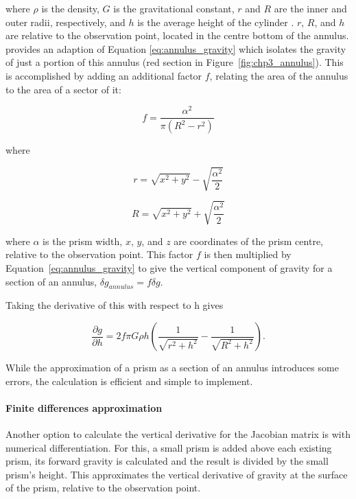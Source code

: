 \noindent
where $\rho$ is the density, $G$ is the gravitational constant, $r$ and $R$ are the inner and outer radii, respectively, and $h$ is the average height of the cylinder \citep{hammerterrain1939}. $r$, $R$, and $h$ are relative to the observation point, located in the centre bottom of the annulus. \citet{mccubbineairborne2016} provides an adaption of Equation \ref{eq:annulus_gravity} which isolates the gravity of just a portion of this annulus (red section in Figure~\ref{fig:chp3_annulus}). This is accomplished by adding an additional factor $f$, relating the area of the annulus to the area of a sector of it:

\begin{equation}
f = \frac{\alpha^2}{\pi(R^2 - r^2)}
\end{equation}

\noindent
where

\begin{equation}
r = \sqrt{x^2+y^2} - \sqrt{\frac{\alpha^2}{2}}
\end{equation}

\begin{equation}
R = \sqrt{x^2+y^2} + \sqrt{\frac{\alpha^2}{2}}
\end{equation}

\noindent
where $\alpha$ is the prism width, $x$, $y$, and $z$ are coordinates of the prism centre, relative to the observation point. This factor $f$ is then multiplied by Equation~\ref{eq:annulus_gravity} to give the vertical component of gravity for a section of an annulus, $\delta g_{annulus} = f \delta g$.

Taking the derivative of this with respect to h gives

\begin{equation} \label{eq:vertical_derivative_annulus}
\dfrac{\partial g}{\partial h} = 2 f \pi G \rho h ( 
    \dfrac{1}{\sqrt{r^2 + h^2}} - \dfrac{1}{\sqrt{R^2 + h^2}} ).
\end{equation}

While the approximation of a prism as a section of an annulus introduces some errors, the calculation is efficient and simple to implement.

\paragraph*{Finite differences approximation}

Another option to calculate the vertical derivative for the Jacobian matrix is with numerical differentiation. For this, a small prism is added above each existing prism, its forward gravity is calculated and the result is divided by the small prism's height. This approximates the vertical derivative of gravity at the surface of the prism, relative to the observation point. \\


